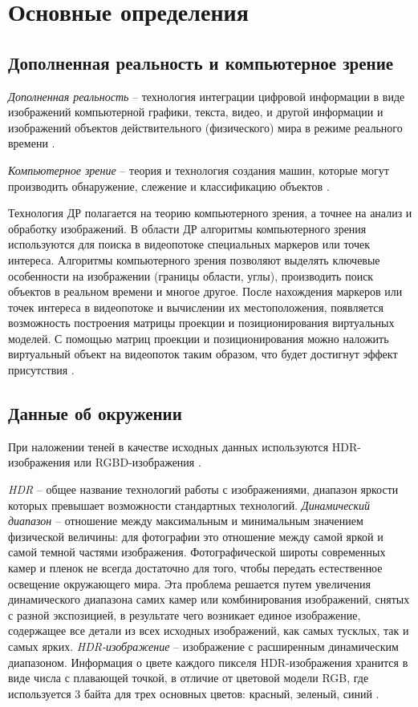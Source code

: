 \section{Основные определения}

\subsection{Дополненная реальность и компьютерное зрение}

\textit{Дополненная реальность} -- технология интеграции цифровой информации в виде изображений компьютерной графики, текста, видео, и другой информации и изображений объектов действительного (физического) мира в режиме реального времени \cite{tech-ar}.

\textit{Компьютерное зрение} -- теория и технология создания машин, которые могут производить обнаружение, слежение и классификацию объектов \cite{comp_vision}. 

Технология ДР полагается на теорию компьютерного зрения, а точнее на анализ и обработку изображений. В области
ДР алгоритмы компьютерного зрения используются для поиска в видеопотоке специальных маркеров или точек интереса. Алгоритмы компьютерного зрения позволяют выделять ключевые особенности на изображении (границы области, углы), производить поиск объектов в реальном времени и многое другое. После нахождения маркеров или точек интереса в видеопотоке и вычислении их местоположения, появляется возможность построения матрицы проекции и позиционирования виртуальных моделей. С помощью матриц проекции и позиционирования можно наложить виртуальный объект на видеопоток таким образом, что будет достигнут эффект присутствия \cite{tech-ar}.

\subsection{Данные об окружении}

При наложении теней в качестве исходных данных используются HDR-изображения или RGBD-изображения \cite{debevec2008rendering} \cite{sns_tras}.

\textit{HDR} -- общее название технологий работы с изображениями, диапазон яркости которых превышает возможности стандартных технологий. \textit{Динамический диапазон} -- отношение между максимальным и минимальным значением физической величины: для фотографии это отношение между самой яркой и самой темной частями изображения. Фотографической широты современных камер и пленок не всегда достаточно для того, чтобы передать естественное освещение окружающего мира. Эта проблема решается путем увеличения динамического диапазона самих камер или комбинирования изображений, снятых с разной экспозицией, в результате чего возникает единое изображение, содержащее все детали из всех исходных изображений, как самых тусклых, так и самых ярких. \textit{HDR-изображение} -- изображение с расширенным динамическим диапазоном. Информация о цвете каждого пикселя HDR-изображения хранится в виде числа с плавающей точкой, в отличие от цветовой модели RGB, где используется 3 байта для трех основных цветов: красный, зеленый, синий \cite{hdri}.

